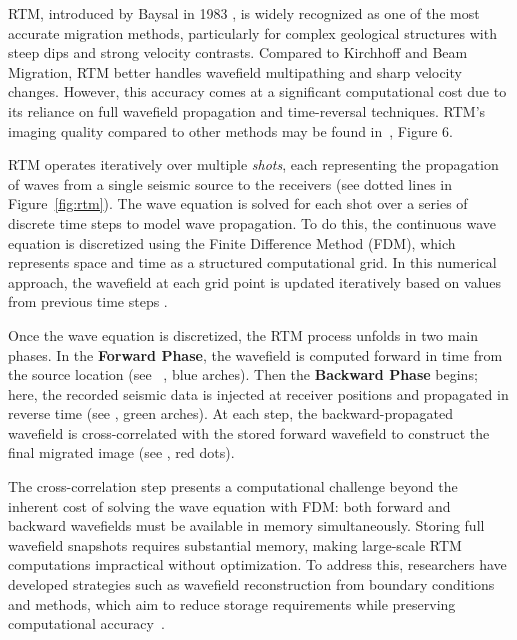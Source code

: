 \documentclass[Ingles,Final]{ic-tese-v3}
\begin{document}
RTM, introduced by Baysal \etal in 1983 \cite{rtm}, is widely recognized as one of the most accurate migration methods, particularly for complex geological structures with steep dips and strong velocity contrasts. Compared to Kirchhoff and Beam Migration, RTM better handles wavefield multipathing and sharp velocity changes. However, this accuracy comes at a significant computational cost due to its reliance on full wavefield propagation and time-reversal techniques. RTM's imaging quality compared to other methods may be found in~\cite{etgen2009}, Figure 6.





RTM operates iteratively over multiple \textit{shots}, each representing the propagation of waves from a single seismic source to the receivers (see dotted lines in Figure~\ref{fig:rtm}). The wave equation is solved for each shot over a series of discrete time steps to model wave propagation. To do this, the continuous wave equation is discretized using the Finite Difference Method (FDM), which represents space and time as a structured computational grid. In this numerical approach, the wavefield at each grid point is updated iteratively based on values from previous time steps \cite{etgen2009}.

Once the wave equation is discretized, the RTM process unfolds in two main phases. In the \textbf{Forward Phase}, the wavefield is computed forward in time from the source location (see ~, blue arches). Then the \textbf{Backward Phase} begins; here, the recorded seismic data is injected at receiver positions and propagated in reverse time (see , green arches). At each step, the backward-propagated wavefield is cross-correlated with the stored forward wavefield to construct the final migrated image (see , red dots)\cite{etgen2009}.

The cross-correlation step presents a computational challenge beyond the inherent cost of solving the wave equation with FDM: both forward and backward wavefields must be available in memory simultaneously. Storing full wavefield snapshots requires substantial memory, making large-scale RTM computations impractical without optimization. To address this, researchers have developed strategies such as wavefield reconstruction from boundary conditions and \checkpointing methods, which aim to reduce storage requirements while preserving computational accuracy~\cite{dussand2008, symes2007}.
\end{document}
